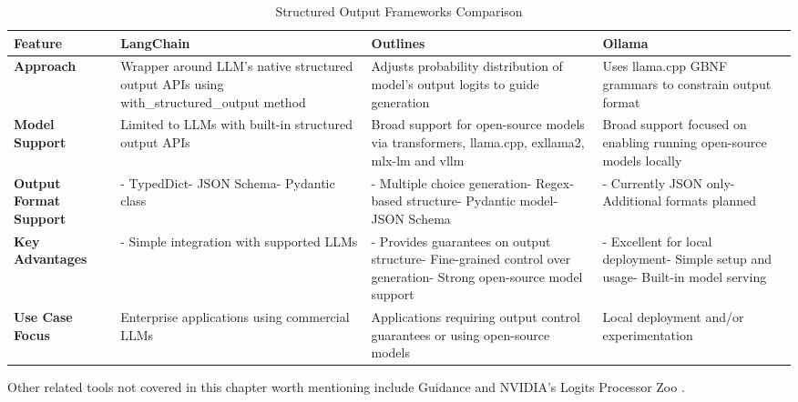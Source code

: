\begin{table*}[h]
\caption{Structured Output Frameworks Comparison}
\label{structured_output_frameworks}
\begin{tabular}{|p{}|p{}|p{}|p{}|}
\hline
\textbf{Feature} & \textbf{LangChain} & \textbf{Outlines} & \textbf{Ollama} \\
\hline
\textbf{Approach} & Wrapper around LLM's native structured output APIs using with\_structured\_output method & Adjusts probability distribution of model's output logits to guide generation & Uses llama.cpp GBNF grammars to constrain output format \\
\hline
\textbf{Model Support} & Limited to LLMs with built-in structured output APIs & Broad support for open-source models via transformers, llama.cpp, exllama2, mlx-lm and vllm & Broad support focused on enabling running open-source models locally \\
\hline
\textbf{Output Format Support} & - TypedDict\newline - JSON Schema\newline - Pydantic class & - Multiple choice generation\newline - Regex-based structure\newline - Pydantic model\newline - JSON Schema & - Currently JSON only\newline - Additional formats planned \\
\hline
\textbf{Key Advantages} & - Simple integration with supported LLMs & - Provides guarantees on output structure\newline - Fine-grained control over generation\newline - Strong open-source model support & - Excellent for local deployment\newline - Simple setup and usage\newline - Built-in model serving \\
\hline
\textbf{Use Case Focus} & Enterprise applications using commercial LLMs & Applications requiring output control guarantees or using open-source models & Local deployment and/or experimentation \\
\hline
\end{tabular}
\end{table*}

Other related tools not covered in this chapter worth mentioning include Guidance \cite{guidance2024repo} and NVIDIA's Logits Processor Zoo \cite{nvidia2024logitsprocessorzoo}.

